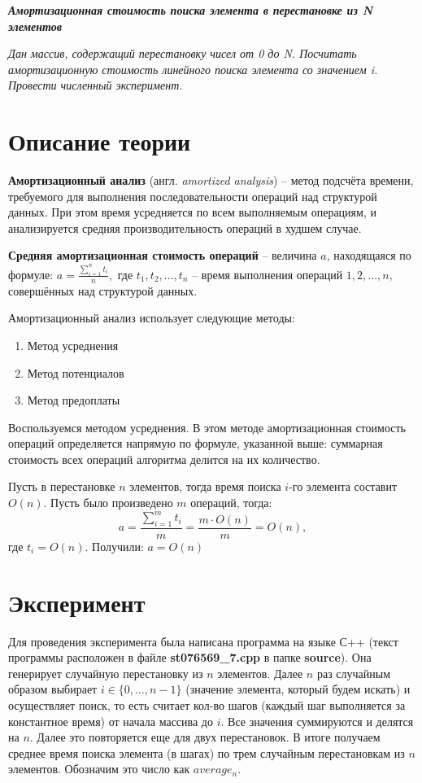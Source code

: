 \documentclass[a4paper,12pt] {report} 			%
\begin{document}
\setlength{\parskip}{4pt}

\begin{center}
	{\LARGE \bfseries \slshape Амортизационная стоимость поиска элемента в перестановке из N элементов}
\end{center}

\textit{
	Дан массив, содержащий перестановку чисел от 0 до N. Посчитать амортизационную стоимость линейного 
	поиска элемента со значением i. Провести численный эксперимент.
}

\section{Описание теории}

{\bfseries Амортизационный анализ} (англ. \textit{amortized analysis}) -- метод подсчёта времени, требуемого для выполнения последовательности операций над структурой данных. При этом время усредняется по всем выполняемым операциям, и анализируется средняя производительность операций в худшем случае.

{\bfseries Средняя амортизационная стоимость операций} -- величина $a$, находящаяся по формуле: $a = \frac{\sum\limits_{i=1}^{n} t_i}{n},$ где $t_1, t_2, \ldots, t_n$ -- время выполнения операций $1, 2, \ldots, n, $  совершённых над структурой данных.

Амортизационный анализ использует следующие методы:

\begin{enumerate}
	\item Метод усреднения
	\item Метод потенциалов
	\item Метод предоплаты
\end{enumerate}

Воспользуемся методом усреднения. В этом методе амортизационная стоимость операций определяется напрямую по формуле, указанной выше: суммарная стоимость всех операций алгоритма делится на их количество.

Пусть в перестановке $n$ элементов, тогда время поиска $i$-го элемента составит $O(n)$. Пусть было произведено $m$ операций, тогда: $$a = \frac{\sum\limits_{i=1}^{m} t_i}{m} = \frac{m \cdot O(n)}{m} = O(n),$$ где $t_i = O(n).$ Получили: $a = O(n)$

\section{Эксперимент}

Для проведения эксперимента была написана программа на языке С++ (текст программы расположен в файле \textbf{st076569\_7.cpp} в папке \textbf{source}). 
Она генерирует случайную перестановку из $n$ элементов. Далее $n$ раз случайным образом выбирает $i \in \{ 0, \ldots , n - 1\}$ (значение элемента, который будем искать) и осуществляет поиск, то есть считает кол-во шагов (каждый шаг выполняется за константное время) от начала массива до $i$. Все значения суммируются и делятся на $n$. Далее это повторяется еще для двух перестановок. В итоге получаем среднее время поиска элемента (в шагах) по трем случайным перестановкам из $n$ элементов. Обозначим это число как $average_n$.
\end{document}
